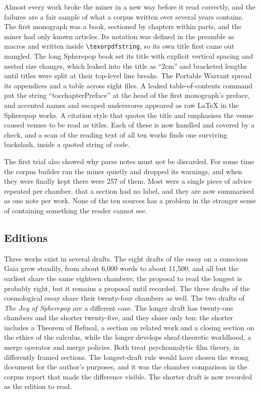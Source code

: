 \documentclass[11pt]{article}
\theoremstyle{remark}
\begin{document}
Almost every work broke the miner in a new way before it read correctly, and the failures are a fair sample of what a corpus written over several years contains. The first monograph was a book, sectioned by chapters within parts, and the miner had only known articles. Its notation was defined in the preamble as macros and written inside \texttt{\textbackslash texorpdfstring}, so its own title first came out mangled. The long Spherepop book set its title with explicit vertical spacing and nested size changes, which leaked into the title as ``2cm'' and bracketed lengths until titles were split at their top-level line breaks. The Portable Warrant spread its appendices and a table across eight files. A leaked table-of-contents command put the string ``tocchapterPreface'' at the head of the first monograph's preface, and accented names and escaped underscores appeared as raw LaTeX in the Spherepop works. A citation style that quotes the title and emphasises the venue caused venues to be read as titles. Each of these is now handled and covered by a check, and a scan of the reading text of all ten works finds one surviving backslash, inside a quoted string of code.

The first trial also showed why parse notes must not be discarded. For some time the corpus builder ran the miner quietly and dropped its warnings, and when they were finally kept there were 257 of them. Most were a single piece of advice repeated per chamber, that a section had no label, and they are now summarised as one note per work. None of the ten sources has a problem in the stronger sense of containing something the reader cannot see.

\subsection{Editions}

Three works exist in several drafts. The eight drafts of the essay on a conscious Gaia grew steadily, from about 6,000 words to about 11,500, and all but the earliest share the same eighteen chambers; the proposal to read the longest is probably right, but it remains a proposal until recorded. The three drafts of the cosmological essay share their twenty-four chambers as well. The two drafts of \emph{The Joy of Spherepop} are a different case. The longer draft has twenty-one chambers and the shorter twenty-five, and they share only ten: the shorter includes a Theorem of Refusal, a section on related work and a closing section on the ethics of the calculus, while the longer develops sheaf-theoretic worldhood, a merge operator and merge policies. Both treat psychoanalytic film theory, in differently framed sections. The longest-draft rule would have chosen the wrong document for the author's purposes, and it was the chamber comparison in the corpus report that made the difference visible. The shorter draft is now recorded as the edition to read.
\end{document}
